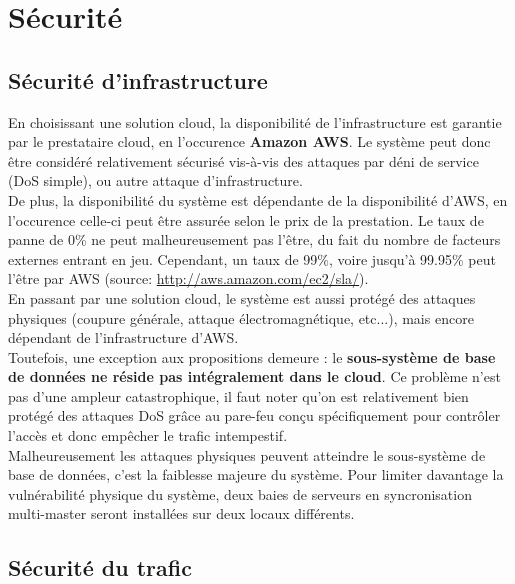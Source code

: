 \section{Sécurité}
\label{sec:securite}

\subsection{Sécurité d'infrastructure}
\label{subsec:securite-infrastructure}

En choisissant une solution cloud, la disponibilité de l'infrastructure est
garantie par le prestataire cloud, en l'occurence \textbf{Amazon AWS}. Le
système peut donc être considéré relativement sécurisé vis-à-vis des attaques
par déni de service (DoS simple), ou autre attaque d'infrastructure. \\

De plus, la disponibilité du système est dépendante de la disponibilité d'AWS,
en l'occurence celle-ci peut être assurée selon le prix de la prestation. Le
taux de panne de 0\% ne peut malheureusement pas l'être, du fait du nombre de
facteurs externes entrant en jeu. Cependant, un taux de 99\%, voire jusqu'à
99.95\% peut l'être par AWS (source: \url{http://aws.amazon.com/ec2/sla/}). \\

En passant par une solution cloud, le système est aussi protégé des attaques
physiques (coupure générale, attaque électromagnétique, etc...), mais encore
dépendant de l'infrastructure d'AWS. \\

Toutefois, une exception aux propositions demeure : le \textbf{sous-système de
base de données ne réside pas intégralement dans le cloud}. Ce problème n'est
pas d'une ampleur catastrophique, il faut noter qu'on est relativement bien
protégé des attaques DoS grâce au pare-feu conçu spécifiquement pour contrôler
l'accès et donc empêcher le trafic intempestif. \\

Malheureusement les attaques physiques peuvent atteindre le sous-système de
base de données, c'est la faiblesse majeure du système. Pour limiter davantage
la vulnérabilité physique du système, deux baies de serveurs en syncronisation
multi-master seront installées sur deux locaux différents.

\subsection{Sécurité du trafic}
\label{subsec:securite-trafic}

